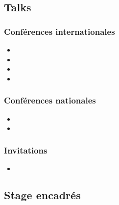 \subsection{Talks}

\subsubsection*{Conférences internationales}

\begin{itemize}
\item {}
\item {}
\item {}
\item {}
\end{itemize}

\subsubsection*{Conférences nationales}

\begin{itemize}
\item {}
\item {}
\end{itemize}

\subsubsection*{Invitations}

\begin{itemize}
\item {}
\end{itemize}

\subsection{Stage encadrés}

